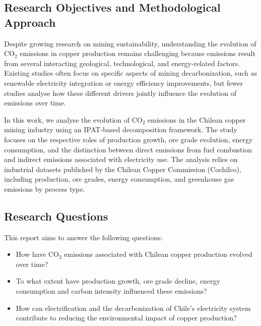 \subsection{Research Objectives and Methodological Approach}

Despite growing research on mining sustainability, understanding the evolution of CO$_2$ emissions in copper production remains challenging because emissions result from several interacting geological, technological, and energy-related factors. Existing studies often focus on specific aspects of mining decarbonization, such as renewable electricity integration or energy efficiency improvements, but fewer studies analyse how these different drivers jointly influence the evolution of emissions over time.

In this work, we analyse the evolution of CO$_2$ emissions in the Chilean copper mining industry using an IPAT-based decomposition framework. The study focuses on the respective roles of production growth, ore grade evolution, energy consumption, and the distinction between direct emissions from fuel combustion and indirect emissions associated with electricity use. The analysis relies on industrial datasets published by the Chilean Copper Commission (Cochilco), including production, ore grades, energy consumption, and greenhouse gas emissions by process type.

\subsection{Research Questions}

This report aims to answer the following questions:

\begin{itemize}
    \item How have CO$_2$ emissions associated with Chilean copper production evolved over time?

    \item To what extent have production growth, ore grade decline, energy consumption and carbon intensity influenced these emissions?

    \item How can electrification and the decarbonization of Chile’s electricity system contribute to reducing the environmental impact of copper production?
\end{itemize}


